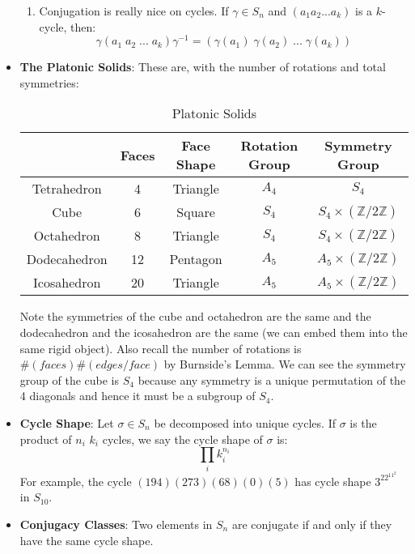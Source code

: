 \documentclass[11pt, oneside]{amsart}   	%
\theoremstyle{definition}
\begin{document}
\begin{itemize}
\begin{enumerate}
			\item Conjugation is really nice on cycles. If $\gamma\in S_n$ and $(a_1 a_2 ... a_k)$ is a $k$-cycle, then:
			$$
				\gamma (a_1 \; a_2 \; ... \; a_k) \gamma^{-1} = (\gamma(a_1) \; \gamma(a_2) \; ... \; \gamma(a_k))
			$$
			
		\end{enumerate}
	
	\item \textbf{The Platonic Solids}: These are, with the number of rotations and total symmetries:
	
	\begin{table}[H]
	\centering
	\begin{tabular}{ | c | c | c | c | c | }
		\hline
		~ & Faces & Face Shape & Rotation Group & Symmetry Group \\
		\hline
		Tetrahedron & 4 & Triangle & $A_4$ & $S_4$\\
		\hline
		Cube & 6 & Square & $S_4$ & $S_4\times (\mathbb Z/2\mathbb Z)$ \\
		\hline
		Octahedron & 8 & Triangle & $S_4$ & $S_4\times (\mathbb Z/2\mathbb Z)$ \\
		\hline
		Dodecahedron & 12 & Pentagon & $A_5$ & $A_5\times (\mathbb Z/2\mathbb Z)$ \\
		\hline
		Icosahedron & 20 & Triangle & $A_5$ & $A_5\times (\mathbb Z/2\mathbb Z)$ \\
		\hline
	\end{tabular}
	\caption{Platonic Solids}
	\end{table}
	
	Note the symmetries of the cube and octahedron are the same and the dodecahedron and the icosahedron are the same (we can embed them 
	into the same rigid object). Also recall the number of rotations is $\#(faces)\#(edges / face)$ by Burnside's Lemma. We can see the symmetry 
	group of the cube is $S_4$ because any symmetry is a unique permutation of the 4 diagonals and hence it must be a subgroup of $S_4$. 
	
	\item \textbf{Cycle Shape}: Let $\sigma\in S_n$ be decomposed into unique cycles. If $\sigma$ is the product of $n_i$ $k_i$ cycles, we say 
	the cycle shape of $\sigma$ is:
	$$
		\prod_ik_i^{n_i}
	$$
	For example, the cycle $(194)(273)(68)(0)(5)$ has cycle shape $3^22^11^2$ in $S_{10}$.
	
	\item \textbf{Conjugacy Classes}: Two elements in $S_n$ are conjugate if and only if they have the same cycle shape.
	

\end{itemize}
\end{document}
